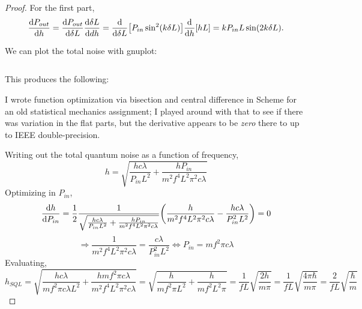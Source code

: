 \documentclass{article}
\begin{document}
\begin{proof}
  For the first part,
  \[
    \dv{P_{out}}{h} = \dv{P_{out}}{\delta L}\dv{\delta L}{dh} = \dv{\delta L}\qty[P_{in}\sin^{2}(k\delta L)]\dv{h}\qty[hL]
    = kP_{in}L\sin(2k\delta L).
  \]

  We can plot the total noise with gnuplot:
  \inputminted{gnuplot}{p1.gp}
  This produces the following:
  \begin{center}
    
  \end{center}

  I wrote function optimization via bisection and central difference in Scheme for an old statistical mechanics assignment;
  I played around with that to see if there was variation in the flat parts,
  but the derivative appears to be \textit{zero} there to up to IEEE double-precision.

  Writing out the total quantum noise as a function of frequency,
  \[
    h = \sqrt{\frac{hc\lambda}{P_{in}L^{2}} + \frac{hP_{in}}{m^{2}f^{4}L^{2}\pi^{2}c\lambda}}
  \]
  Optimizing in $P_{in}$,
  \[
    \dv{h}{P_{in}} = \frac{1}{2}\frac{1}{\sqrt{\frac{hc\lambda}{P_{in}L^{2}} + \frac{hP_{in}}{m^{2}f^{4}L^{2}\pi^{2}c\lambda}}}
    \qty(\frac{h}{m^{2}f^{4}L^{2}\pi^{2}c\lambda}-\frac{hc\lambda}{P_{in}^{2}L^{2}}) = 0
  \]
  \[
    \Rightarrow \frac{1}{m^{2}f^{4}L^{2}\pi^{2}c\lambda} =  \frac{c\lambda}{P_{in}^{2}L^{2}}
    \Leftrightarrow P_{in} = mf^{2}\pi c\lambda
  \]
  Evaluating,
  \[
    h_{SQL} = \sqrt{\frac{hc\lambda}{mf^{2}\pi c\lambda L^{2}} + \frac{hmf^{2}\pi c\lambda}{m^{2}f^{4}L^{2}\pi^{2}c\lambda}}
    = \sqrt{\frac{h}{mf^{2}\pi L^{2}} + \frac{h}{mf^{2}L^{2}\pi}}
    = \frac{1}{fL}\sqrt{\frac{2h}{m\pi}}
    = \frac{1}{fL}\sqrt{\frac{4\pi\hbar}{m\pi}}
    = \frac{2}{fL}\sqrt{\frac{\hbar}{m}}
  \]

\end{proof}
\end{document}
